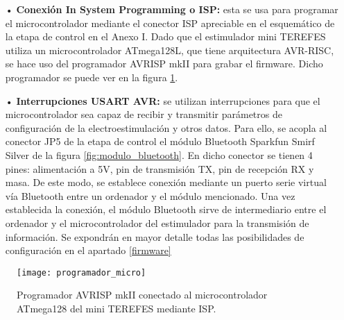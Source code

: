 \begin{itemize}
\item[•] \textbf{Conexión In System Programming o ISP:} esta se usa para programar el microcontrolador mediante el conector ISP apreciable en el esquemático de la etapa de control en el Anexo I. Dado que el estimulador mini TEREFES utiliza un microcontrolador ATmega128L, que tiene arquitectura AVR-RISC, se hace uso del programador AVRISP mkII\cite{programador} para grabar el firmware. Dicho programador se puede ver en la figura \ref{fig:programador_micro}.

\item[•] \textbf{Interrupciones USART AVR:} se utilizan interrupciones para que el microcontrolador sea capaz de recibir y transmitir parámetros de configuración de la electroestimulación y otros datos. Para ello, se acopla al conector JP5 de la etapa de control el módulo Bluetooth Sparkfun Smirf Silver de la figura \ref{fig:modulo_bluetooth}. En dicho conector se tienen 4 pines: alimentación a 5V, pin de transmisión TX, pin de recepción RX y masa. De este modo, se establece conexión mediante un puerto serie virtual vía Bluetooth entre un ordenador y el módulo mencionado. Una vez establecida la conexión, el módulo Bluetooth sirve de intermediario entre el ordenador y el microcontrolador del estimulador para la transmisión de información. Se expondrán en mayor detalle todas las posibilidades de configuración en el apartado \ref{firmware}



\end{itemize}

\begin{figure}[!htb]
\centering
\texttt{[image: programador\_micro]}
  \caption{Programador AVRISP mkII conectado al microcontrolador ATmega128 del mini TEREFES mediante ISP.}\label{fig:programador_micro}
\end{figure}


